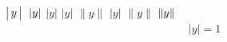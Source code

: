 \documentclass{article}
\begin{document}
$\bigl\arrowvert y \bigr\arrowvert$ $\arrowvert y \arrowvert$ $\bigl\vert y \bigr\vert$ $\big\lvert y \big\rvert$ $\bigl\| y \bigr\|$ $\bigl\lvert y\bigr\rvert$ $\bigl\lVert y\bigr\rVert$ $\Arrowvert y\Arrowvert$
\[\begin{gathered}\bigl\lvert y\bigr\rvert=1\end{gathered}\]
\end{document}
